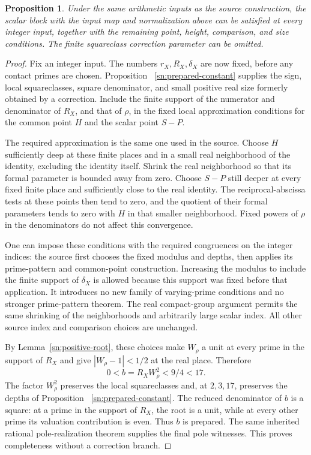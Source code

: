 \documentclass[11pt,a4paper]{article}
\newtheorem{proposition}[theorem]{Proposition}
\theoremstyle{definition}
\theoremstyle{remark}
\begin{document}
\begin{proposition}\label{sn:simultaneous-completeness}
Under the same arithmetic inputs as the source construction,
the scalar block with the input map and normalization above
can be satisfied at every integer input, together with the
remaining point, height, comparison, and size conditions.
The finite squareclass correction parameter can be omitted.
\end{proposition}
\begin{proof}
Fix an integer input.  The numbers $r_X,R_X,\delta_X$ are
now fixed, before any contact primes are chosen.  Proposition~
\ref{sn:prepared-constant} supplies the sign, local squareclasses,
square denominator, and small positive real size formerly obtained
by a correction.  Include the finite support of the numerator
and denominator of $R_X$, and that of $\rho$, in the fixed
local approximation conditions for the common point $H$ and
the scalar point $S-P$.

The required approximation is the same one used in the source.
Choose $H$ sufficiently deep at these finite places and in a
small real neighborhood of the identity, excluding the identity
itself.  Shrink the real neighborhood so that its formal
parameter is bounded away from zero.  Choose $S-P$ still deeper
at every fixed finite place and sufficiently close to the real
identity.  The reciprocal-abscissa tests at these points then
tend to zero, and the quotient of their formal parameters
tends to zero with $H$ in that smaller neighborhood.
Fixed powers of $\rho$ in the denominators do not affect this
convergence.

One can impose these conditions with the required congruences
on the integer indices: the source first chooses the fixed
modulus and depths, then applies its prime-pattern and common-point
construction.  Increasing the modulus to include the finite
support of $\delta_X$ is allowed because this support was fixed
before that application.  It introduces no new family of
varying-prime conditions and no stronger prime-pattern theorem.
The real compact-group argument permits the same shrinking of
the neighborhoods and arbitrarily large scalar index.  All
other source index and comparison choices are unchanged.

By Lemma~\ref{sn:positive-root}, these choices make
$W_\rho$ a unit at every prime in the support of $R_X$ and
give $|W_\rho-1|<1/2$ at the real place.  Therefore
\[
                       0<b=R_XW_\rho^2<9/4<17.
\]
The factor $W_\rho^2$ preserves the local squareclasses and,
at $2,3,17$, preserves the depths of Proposition~
\ref{sn:prepared-constant}.  The reduced denominator of $b$
is a square: at a prime in the support of $R_X$, the root is
a unit, while at every other prime its valuation contribution
is even.  Thus $b$ is prepared.  The same inherited rational
pole-realization theorem supplies the final pole witnesses.
This proves completeness without a correction branch.
\end{proof}
\end{document}
